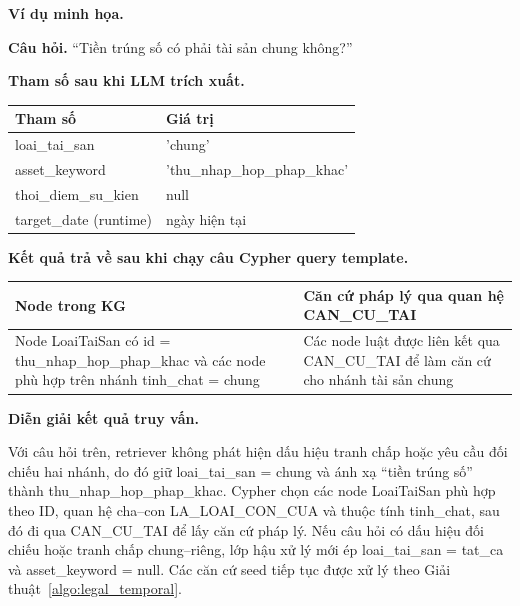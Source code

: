 \documentclass[../DoAn.tex]{subfiles}
\begin{document}
\textbf{Ví dụ minh họa.}

\textbf{Câu hỏi.}
``Tiền trúng số có phải tài sản chung không?''

\textbf{Tham số sau khi LLM trích xuất.}
\begin{center}
  \footnotesize
  \begin{tabularx}{\textwidth}{|>{\raggedright\arraybackslash}p{3.4cm}|>{\raggedright\arraybackslash}X|}
    \hline
    \textbf{Tham số} & \textbf{Giá trị} \\ \hline
    loai\_\allowbreak tai\_\allowbreak san & 'chung' \\ \hline
    asset\_\allowbreak keyword & 'thu\_nhap\_hop\_phap\_khac' \\ \hline
    thoi\_\allowbreak diem\_\allowbreak su\_\allowbreak kien & null \\ \hline
    target\_\allowbreak date (runtime) & ngày hiện tại \\ \hline
  \end{tabularx}
\end{center}

\textbf{Kết quả trả về sau khi chạy câu Cypher query template.}
\begin{center}
  \footnotesize
  \begin{tabularx}{\textwidth}{|>{\raggedright\arraybackslash}X|>{\raggedright\arraybackslash}X|}
    \hline
    \textbf{Node trong KG} & \textbf{Căn cứ pháp lý qua quan hệ CAN\_CU\_TAI} \\ \hline
    Node LoaiTaiSan có id = thu\_\allowbreak nhap\_\allowbreak hop\_\allowbreak phap\_\allowbreak khac và các node phù hợp trên nhánh tinh\_\allowbreak chat = chung & Các node luật được liên kết qua CAN\_CU\_TAI để làm căn cứ cho nhánh tài sản chung \\ \hline
  \end{tabularx}
\end{center}

\textbf{Diễn giải kết quả truy vấn.}

Với câu hỏi trên, retriever không phát hiện dấu hiệu tranh chấp hoặc yêu cầu đối chiếu hai nhánh, do đó giữ loai\_tai\_san = chung và ánh xạ ``tiền trúng số'' thành thu\_nhap\_hop\_phap\_khac. Cypher chọn các node LoaiTaiSan phù hợp theo ID, quan hệ cha--con LA\_LOAI\_CON\_CUA và thuộc tính tinh\_chat, sau đó đi qua CAN\_CU\_TAI để lấy căn cứ pháp lý. Nếu câu hỏi có dấu hiệu đối chiếu hoặc tranh chấp chung--riêng, lớp hậu xử lý mới ép loai\_tai\_san = tat\_ca và asset\_keyword = null. Các căn cứ seed tiếp tục được xử lý theo Giải thuật~\ref{algo:legal_temporal}.
\end{document}
